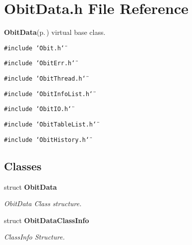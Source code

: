 \section{Obit\-Data.h File Reference}
\label{ObitData_8h}
{\bf Obit\-Data}{\rm (p.\,\pageref{structObitData})} virtual base class. 

{\tt \#include \char`\"{}Obit.h\char`\"{}}\par
{\tt \#include \char`\"{}Obit\-Err.h\char`\"{}}\par
{\tt \#include \char`\"{}Obit\-Thread.h\char`\"{}}\par
{\tt \#include \char`\"{}Obit\-Info\-List.h\char`\"{}}\par
{\tt \#include \char`\"{}Obit\-IO.h\char`\"{}}\par
{\tt \#include \char`\"{}Obit\-Table\-List.h\char`\"{}}\par
{\tt \#include \char`\"{}Obit\-History.h\char`\"{}}\par
\subsection*{Classes}
\begin{CompactItemize}
\item 
struct {\bf Obit\-Data}
\begin{CompactList}\small\item\em Obit\-Data Class structure. \item\end{CompactList}\item 
struct {\bf Obit\-Data\-Class\-Info}
\begin{CompactList}\small\item\em Class\-Info Structure. \item\end{CompactList}\end{CompactItemize}
